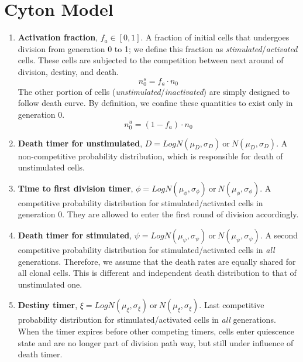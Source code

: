 \documentclass{article}
\newcommand{\enterProblemHeader}[1]{
    }
\newcommand{\exitProblemHeader}[1]{
    }
\newcounter{homeworkProblemCounter} %
\newcommand{\homeworkProblemName}{}
\newenvironment{homeworkProblem}[1][Problem \arabic{homeworkProblemCounter}]{ %
    \stepcounter{homeworkProblemCounter} %
    \renewcommand{\homeworkProblemName}{#1} %
    \section{\homeworkProblemName} %
    \enterProblemHeader{\homeworkProblemName} %
    }{
    \exitProblemHeader{\homeworkProblemName} %
    }
\begin{document}
\begin{homeworkProblem}[Cyton Model]
\begin{enumerate}
            \item \textbf{Activation fraction}, $f_a \in [0, 1]$. A fraction of initial cells that undergoes division from generation 0 to 1; we define this fraction as \textit{stimulated}/\textit{activated} cells. These cells are subjected to the competition between next around of division, destiny, and death.
            \begin{equation}
                n_0^s = f_a \cdot n_0
            \end{equation}
            The other portion of cells (\textit{unstimulated}/\textit{inactivated}) are simply designed to follow death curve. By definition, we confine these quantities to exist only in generation 0.
            \begin{equation}
                n_0^u = (1 - f_a) \cdot n_0
            \end{equation}

            \item \textbf{Death timer for unstimulated}, $D = LogN(\mu_D, \sigma_D) \ \mathrm{or} \ N(\mu_D, \sigma_D)$. A non-competitive probability distribution, which is responsible for death of unstimulated cells.
            
            \item \textbf{Time to first division timer}, $\phi = LogN(\mu_{\phi}, \sigma_{\phi})\ \mathrm{or} \ N(\mu_{\phi}, \sigma_{\phi})$. A competitive probability distribution for stimulated/activated cells in generation 0. They are allowed to enter the first round of division accordingly.
            
            \item \textbf{Death timer for stimulated}, $\psi = LogN(\mu_{\psi}, \sigma_{\psi})\ \mathrm{or} \ N(\mu_{\psi}, \sigma_{\psi})$. A second competitive probability distribution for stimulated/activated cells in \textit{all} generations. Therefore, we assume that the death rates are equally shared for all clonal cells. This is different and independent death distribution to that of unstimulated one.
            
            \item \textbf{Destiny timer}, $\xi = LogN(\mu_{\xi}, \sigma_{\xi})\ \mathrm{or} \ N(\mu_{\xi}, \sigma_{\xi})$. Last competitive probability distribution for stimulated/activated cells in \textit{all} generations. When the timer expires before other competing timers, cells enter quiescence state and are no longer part of division path way, but still under influence of death timer.
            

\end{enumerate}
\end{homeworkProblem}
\end{document}
